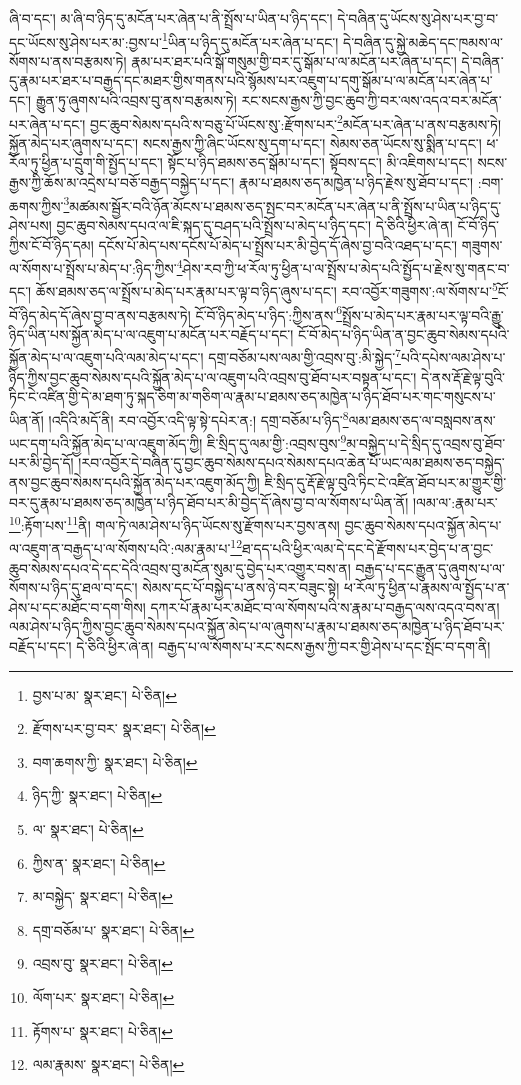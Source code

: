 ཞི་བ་དང་། མ་ཞི་བ་ཉིད་དུ་མངོན་པར་ཞེན་པ་ནི་སྤྲོས་པ་ཡིན་པ་ཉིད་དང་། དེ་བཞིན་དུ་ཡོངས་སུ་ཤེས་པར་བྱ་བ་དང་ཡོངས་སུ་ཤེས་པར་མ་:བྱས་པ་\footnote{བྱས་པ་མ་  སྣར་ཐང་།  པེ་ཅིན། }ཡིན་པ་ཉིད་དུ་མངོན་པར་ཞེན་པ་དང་། དེ་བཞིན་དུ་སྐྱེ་མཆེད་དང་ཁམས་ལ་སོགས་པ་ནས་བརྩམས་ཏེ། རྣམ་པར་ཐར་པའི་སྒོ་གསུམ་གྱི་བར་དུ་སྒོམ་པ་ལ་མངོན་པར་ཞེན་པ་དང་། དེ་བཞིན་དུ་རྣམ་པར་ཐར་པ་བརྒྱད་དང་མཐར་གྱིས་གནས་པའི་སྙོམས་པར་འཇུག་པ་དགུ་སྒོམ་པ་ལ་མངོན་པར་ཞེན་པ་དང་། རྒྱུན་ཏུ་ཞུགས་པའི་འབྲས་བུ་ནས་བརྩམས་ཏེ། རང་སངས་རྒྱས་ཀྱི་བྱང་ཆུབ་ཀྱི་བར་ལས་འདའ་བར་མངོན་པར་ཞེན་པ་དང་། བྱང་ཆུབ་སེམས་དཔའི་ས་བཅུ་པོ་ཡོངས་སུ་:རྫོགས་པར་\footnote{རྫོགས་པར་བྱ་བར་  སྣར་ཐང་།  པེ་ཅིན། }མངོན་པར་ཞེན་པ་ནས་བརྩམས་ཏེ། སྐྱོན་མེད་པར་ཞུགས་པ་དང་། སངས་རྒྱས་ཀྱི་ཞིང་ཡོངས་སུ་དག་པ་དང་། སེམས་ཅན་ཡོངས་སུ་སྨིན་པ་དང་། ཕ་རོལ་ཏུ་ཕྱིན་པ་དྲུག་གི་སྤྱོད་པ་དང་། སྟོང་པ་ཉིད་ཐམས་ཅད་སྒོམ་པ་དང་། སྟོབས་དང་། མི་འཇིགས་པ་དང་། སངས་རྒྱས་ཀྱི་ཆོས་མ་འདྲེས་པ་བཅོ་བརྒྱད་བསྐྱེད་པ་དང་། རྣམ་པ་ཐམས་ཅད་མཁྱེན་པ་ཉིད་རྗེས་སུ་ཐོབ་པ་དང་། :བག་ཆགས་ཀྱིས་\footnote{བག་ཆགས་ཀྱི་  སྣར་ཐང་།  པེ་ཅིན། }མཚམས་སྦྱོར་བའི་ཉོན་མོངས་པ་ཐམས་ཅད་སྤང་བར་མངོན་པར་ཞེན་པ་ནི་སྤྲོས་པ་ཡིན་པ་ཉིད་དུ་ཤེས་པས། བྱང་ཆུབ་སེམས་དཔའ་ལ་ཇི་སྐད་དུ་བཤད་པའི་སྤྲོས་པ་མེད་པ་ཉིད་དང་། དེ་ཅིའི་ཕྱིར་ཞེ་ན། ངོ་བོ་ཉིད་ཀྱིས་ངོ་བོ་ཉིད་དམ། དངོས་པོ་མེད་པས་དངོས་པོ་མེད་པ་སྤྲོས་པར་མི་བྱེད་དོ་ཞེས་བྱ་བའི་འཐད་པ་དང་། གཟུགས་ལ་སོགས་པ་སྤྲོས་པ་མེད་པ་:ཉིད་ཀྱིས་\footnote{ཉིད་ཀྱི་  སྣར་ཐང་།  པེ་ཅིན། }ཤེས་རབ་ཀྱི་ཕ་རོལ་ཏུ་ཕྱིན་པ་ལ་སྤྲོས་པ་མེད་པའི་སྤྱོད་པ་རྗེས་སུ་གནང་བ་དང་། ཆོས་ཐམས་ཅད་ལ་སྤྲོས་པ་མེད་པར་རྣམ་པར་ལྟ་བ་ཉིད་ཞུས་པ་དང་། རབ་འབྱོར་གཟུགས་:ལ་སོགས་པ་\footnote{ལ་  སྣར་ཐང་།  པེ་ཅིན། }ངོ་བོ་ཉིད་མེད་དོ་ཞེས་བྱ་བ་ནས་བརྩམས་ཏེ། ངོ་བོ་ཉིད་མེད་པ་ཉིད་:ཀྱིས་ནས་\footnote{ཀྱིས་ན་  སྣར་ཐང་།  པེ་ཅིན། }སྤྲོས་པ་མེད་པར་རྣམ་པར་ལྟ་བའི་རྒྱུ་ཉིད་ཡིན་པས་སྐྱོན་མེད་པ་ལ་འཇུག་པ་མངོན་པར་བརྗོད་པ་དང་། ངོ་བོ་མེད་པ་ཉིད་ཡིན་ན་བྱང་ཆུབ་སེམས་དཔའི་སྐྱོན་མེད་པ་ལ་འཇུག་པའི་ལམ་མེད་པ་དང་། དགྲ་བཅོམ་པས་ལམ་གྱི་འབྲས་བུ་:མི་སྐྱེད་\footnote{མ་བསྐྱེད་  སྣར་ཐང་།  པེ་ཅིན། }པའི་དཔེས་ལམ་ཤེས་པ་ཉིད་ཀྱིས་བྱང་ཆུབ་སེམས་དཔའི་སྐྱོན་མེད་པ་ལ་འཇུག་པའི་འབྲས་བུ་ཐོབ་པར་བསྟན་པ་དང་། དེ་ནས་རྡོ་རྗེ་ལྟ་བུའི་ཏིང་ངེ་འཛིན་གྱི་དེ་མ་ཐག་ཏུ་སྐད་ཅིག་མ་གཅིག་ལ་རྣམ་པ་ཐམས་ཅད་མཁྱེན་པ་ཉིད་ཐོབ་པར་གང་གསུངས་པ་ཡིན་ནོ། །འདིའི་མདོ་ནི། རབ་འབྱོར་འདི་ལྟ་སྟེ་དཔེར་ན:། དགྲ་བཅོམ་པ་ཉིད་\footnote{དགྲ་བཅོམ་པ་  སྣར་ཐང་།  པེ་ཅིན། }ལམ་ཐམས་ཅད་ལ་བསླབས་ནས་ཡང་དག་པའི་སྐྱོན་མེད་པ་ལ་འཇུག་མོད་ཀྱི། ཇི་སྲིད་དུ་ལམ་གྱི་:འབྲས་བུས་\footnote{འབྲས་བུ་  སྣར་ཐང་།  པེ་ཅིན། }མ་བསྐྱེད་པ་དེ་སྲིད་དུ་འབྲས་བུ་ཐོབ་པར་མི་བྱེད་དོ། །རབ་འབྱོར་དེ་བཞིན་དུ་བྱང་ཆུབ་སེམས་དཔའ་སེམས་དཔའ་ཆེན་པོ་ཡང་ལམ་ཐམས་ཅད་བསྐྱེད་ནས་བྱང་ཆུབ་སེམས་དཔའི་སྐྱོན་མེད་པར་འཇུག་མོད་ཀྱི། ཇི་སྲིད་དུ་རྡོ་རྗེ་ལྟ་བུའི་ཏིང་ངེ་འཛིན་ཐོབ་པར་མ་གྱུར་གྱི་བར་དུ་རྣམ་པ་ཐམས་ཅད་མཁྱེན་པ་ཉིད་ཐོབ་པར་མི་བྱེད་དོ་ཞེས་བྱ་བ་ལ་སོགས་པ་ཡིན་ནོ། །ལམ་ལ་:རྣམ་པར་\footnote{ལོག་པར་  སྣར་ཐང་།  པེ་ཅིན། }:རྟོག་པས་\footnote{རྟོགས་པ་  སྣར་ཐང་།  པེ་ཅིན། }ནི། གལ་ཏེ་ལམ་ཤེས་པ་ཉིད་ཡོངས་སུ་རྫོགས་པར་བྱས་ནས། བྱང་ཆུབ་སེམས་དཔའ་སྐྱོན་མེད་པ་ལ་འཇུག་ན་བརྒྱད་པ་ལ་སོགས་པའི་:ལམ་རྣམ་པ་\footnote{ལམ་རྣམས་  སྣར་ཐང་།  པེ་ཅིན། }ཐ་དད་པའི་ཕྱིར་ལམ་དེ་དང་དེ་རྫོགས་པར་བྱེད་པ་ན་བྱང་ཆུབ་སེམས་དཔའ་དེ་དང་དེའི་འབྲས་བུ་མངོན་སུམ་དུ་བྱེད་པར་འགྱུར་བས་ན། བརྒྱད་པ་དང་རྒྱུན་དུ་ཞུགས་པ་ལ་སོགས་པ་ཉིད་དུ་ཐལ་བ་དང་། སེམས་དང་པོ་བསྐྱེད་པ་ནས་ཉེ་བར་བཟུང་སྟེ། ཕ་རོལ་ཏུ་ཕྱིན་པ་རྣམས་ལ་སྤྱོད་པ་ན་ཤེས་པ་དང་མཐོང་བ་དག་གིས། དཀར་པོ་རྣམ་པར་མཐོང་བ་ལ་སོགས་པའི་ས་རྣམ་པ་བརྒྱད་ལས་འདའ་བས་ན། ལམ་ཤེས་པ་ཉིད་ཀྱིས་བྱང་ཆུབ་སེམས་དཔའ་སྐྱོན་མེད་པ་ལ་ཞུགས་པ་རྣམ་པ་ཐམས་ཅད་མཁྱེན་པ་ཉིད་ཐོབ་པར་བརྗོད་པ་དང་། དེ་ཅིའི་ཕྱིར་ཞེ་ན། བརྒྱད་པ་ལ་སོགས་པ་རང་སངས་རྒྱས་ཀྱི་བར་གྱི་ཤེས་པ་དང་སྤོང་བ་དག་ནི། 